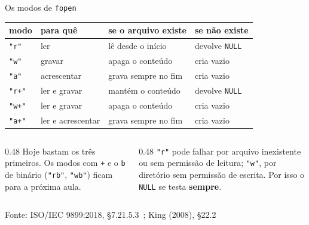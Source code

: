 \documentclass[aspectratio=169]{beamer}
\newcommand{\fonte}[1]{\vfill\hfill{\scriptsize\textcolor{UFSGray}{Fonte: #1}}}
\begin{document}
\begin{frame}{Os modos de \texttt{fopen}}
  \begin{center}
  \small
  \begin{tabular}{@{}llll@{}}
    \toprule
    modo & para quê & se o arquivo existe & se não existe\\
    \midrule
    \texttt{"r"}  & ler                      & lê desde o início          & \textcolor{UFSRed}{devolve \texttt{NULL}}\\
    \texttt{"w"}  & gravar                   & \textcolor{UFSRed}{apaga o conteúdo} & cria vazio\\
    \texttt{"a"}  & acrescentar              & grava sempre no fim        & cria vazio\\
    \midrule
    \texttt{"r+"} & ler e gravar             & mantém o conteúdo          & devolve \texttt{NULL}\\
    \texttt{"w+"} & ler e gravar             & apaga o conteúdo           & cria vazio\\
    \texttt{"a+"} & ler e acrescentar        & grava sempre no fim        & cria vazio\\
    \bottomrule
  \end{tabular}
  \end{center}
  \begin{columns}[T]
    \begin{column}{0.48\textwidth}
      \small Hoje bastam os três primeiros. Os modos com \texttt{+} e o
      \texttt{b} de binário (\texttt{"rb"}, \texttt{"wb"}) ficam para a
      próxima aula.
    \end{column}
    \begin{column}{0.48\textwidth}
      \small \texttt{"r"} pode falhar por arquivo inexistente ou sem
      permissão de leitura; \texttt{"w"}, por diretório sem permissão de
      escrita. Por isso o \texttt{NULL} se testa \textbf{sempre}.
    \end{column}
  \end{columns}
  \fonte{ISO/IEC 9899:2018, §7.21.5.3~\cite{iso2018c17};
    King (2008), §22.2~\cite{king2008c}}
\end{frame}
\end{document}
